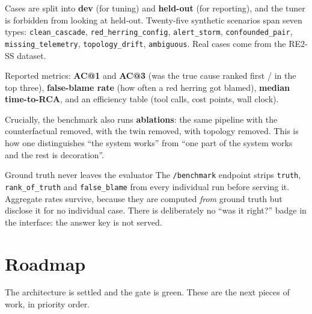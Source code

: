 \documentclass[11pt,a4paper]{article}
\newcommand{\code}[1]{\texttt{\small #1}}
\begin{document}
Cases are split into \textbf{dev} (for tuning) and \textbf{held-out} (for
reporting), and the tuner is forbidden from looking at held-out. Twenty-five
synthetic scenarios span seven types:
\code{clean\_cascade}, \code{red\_herring\_config}, \code{alert\_storm},
\code{confounded\_pair}, \code{missing\_telemetry}, \code{topology\_drift},
\code{ambiguous}. Real cases come from the RE2-SS dataset.

Reported metrics: \textbf{AC@1} and \textbf{AC@3} (was the true cause ranked
first / in the top three), \textbf{false-blame rate} (how often a red herring got
blamed), \textbf{median time-to-RCA}, and an efficiency table (tool calls, cost
points, wall clock).

Crucially, the benchmark also runs \textbf{ablations}: the same pipeline with the
counterfactual removed, with the twin removed, with topology removed. This is how
one distinguishes ``the system works'' from ``one part of the system works and
the rest is decoration''.

\begin{keybox}{Ground truth never leaves the evaluator}
The \code{/benchmark} endpoint strips \code{truth}, \code{rank\_of\_truth} and
\code{false\_blame} from every individual run before serving it. Aggregate rates
survive, because they are computed \emph{from} ground truth but disclose it for
no individual case. There is deliberately no ``was it right?'' badge in the
interface: the answer key is not served.
\end{keybox}

\section{Roadmap}
\label{sec:known}

The architecture is settled and the gate is green. These are the next pieces of
work, in priority order.
\end{document}
